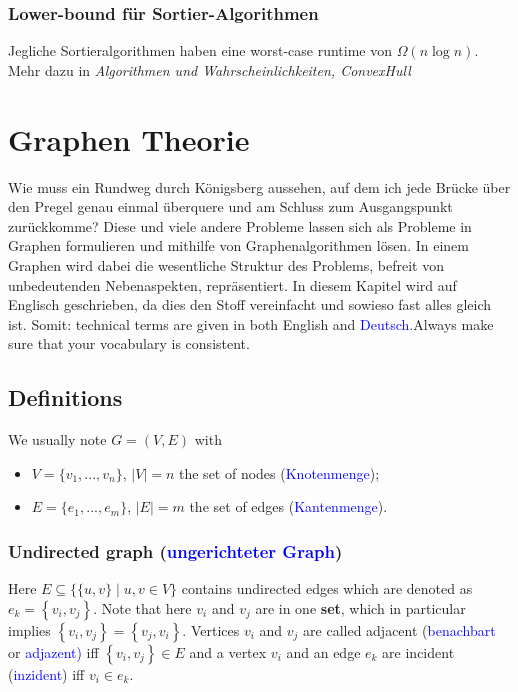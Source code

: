 \documentclass[a4paper]{article}
\begin{document}
     
    \subsubsection{Lower-bound für Sortier-Algorithmen}
    Jegliche Sortieralgorithmen haben eine worst-case runtime von $\Omega(n \log n)$. Mehr dazu in \textit{Algorithmen und Wahrscheinlichkeiten, ConvexHull}
        
        

\newpage
\section{Graphen Theorie}
Wie muss ein Rundweg durch Königsberg aussehen, auf dem ich jede Brücke über den Pregel genau einmal überquere und am Schluss zum Ausgangspunkt zurückkomme? Diese und viele andere Probleme lassen sich als Probleme in Graphen formulieren und mithilfe von Graphenalgorithmen lösen. In einem Graphen wird dabei die wesentliche Struktur des Problems, befreit von unbedeutenden Nebenaspekten, repräsentiert.
In diesem Kapitel wird auf Englisch geschrieben, da dies den Stoff vereinfacht und sowieso fast alles gleich ist. Somit: technical terms are given in both English and \textcolor{blue}{{Deutsch}}.Always make sure that your vocabulary is consistent.

\subsection{Definitions}

We usually note $G=(V,E)$ with
\begin{itemize}
\item $V=\{v_1, ..., v_n\}$, $|V|=n$ the set of nodes (\textcolor{blue}{{Knotenmenge}});
\item $E=\{e_1, ..., e_m\}$, $|E|=m$ the set of edges (\textcolor{blue}{{Kantenmenge}}).
\end{itemize}

\subsubsection{Undirected graph (\textcolor{blue}{{ungerichteter Graph}})}
Here $E\subseteq \{\{u,v\} \mid u,v\in V\}$ contains undirected edges which are denoted as $e_k=\left\lbrace v_i, v_j \right\rbrace$. Note that here $v_i$ and $v_j$ are in one \textbf{set}, which in particular implies $\left\lbrace v_i, v_j \right\rbrace = \left\lbrace v_j, v_i \right\rbrace$. Vertices $v_i$ and $v_j$ are called adjacent (\textcolor{blue}{{benachbart}} or \textcolor{blue}{{adjazent)}} iff $\left\lbrace v_i, v_j \right\rbrace \in E$ and a vertex $v_i$ and an edge $e_k$ are incident (\textcolor{blue}{{inzident}}) iff $v_i \in e_k$.
\end{document}
